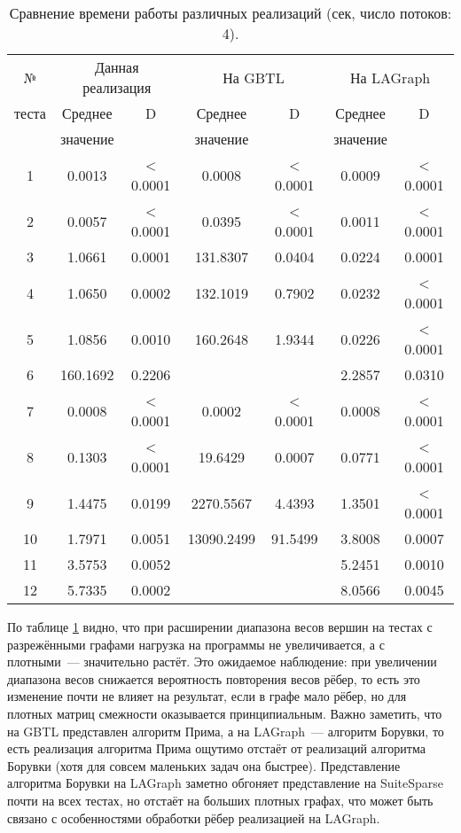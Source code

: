 \documentclass[14pt]{matmex-diploma-custom}
\begin{document}
\begin{table}[ht]
\caption{Сравнение времени работы различных реализаций (сек, число потоков: 4).} \label{2}
\centering
	\begin{tabular}{|c|c|c|c|c|c|c|}\hline
		№ & \multicolumn{2}{c|}{Данная реализация} & \multicolumn{2}{c|}{На GBTL} & \multicolumn{2}{c|}{На LAGraph}\\
		теста & Среднее & D & Среднее & D & Среднее & D \\
                & значение && значение && значение &\\\hline
		1 & 0.0013 & < 0.0001 & 0.0008 & < 0.0001 & 0.0009 & < 0.0001 \\\hline
		2 & 0.0057 & < 0.0001 & 0.0395 & < 0.0001 & 0.0011 & < 0.0001 \\\hline
        	3 & 1.0661 & 0.0001 & 131.8307 & 0.0404 & 0.0224 & 0.0001 \\\hline
        	4 & 1.0650 & 0.0002 & 132.1019 & 0.7902 & 0.0232 & < 0.0001 \\\hline
        	5 & 1.0856 & 0.0010 & 160.2648 & 1.9344 & 0.0226 & < 0.0001 \\\hline
        	6 & 160.1692 & 0.2206 &&& 2.2857 & 0.0310 \\\hline\hline
                7 & 0.0008 & < 0.0001 & 0.0002 & < 0.0001 & 0.0008 & < 0.0001 \\\hline
        	8 & 0.1303 & < 0.0001 & 19.6429 & 0.0007 & 0.0771 & < 0.0001 \\\hline
        	9 & 1.4475 & 0.0199 & 2270.5567 & 4.4393 & 1.3501 & < 0.0001 \\\hline
        	10 & 1.7971 & 0.0051 & 13090.2499 & 91.5499 & 3.8008 & 0.0007 \\\hline
        	11 & 3.5753 & 0.0052 &&& 5.2451 & 0.0010 \\\hline
        	12 & 5.7335 & 0.0002 &&& 8.0566 & 0.0045 \\\hline
        \end{tabular}
\end{table}

По таблице \ref{2} видно, что при расширении диапазона весов вершин на тестах с разрежёнными графами нагрузка на программы не увеличивается, а с плотными~--- значительно растёт. Это ожидаемое наблюдение: при увеличении диапазона весов снижается вероятность повторения весов рёбер, то есть это изменение почти не влияет на результат, если в графе мало рёбер, но для плотных матриц смежности оказывается принципиальным. Важно заметить, что на GBTL представлен алгоритм Прима, а на LAGraph~--- алгоритм Борувки, то есть реализация алгоритма Прима ощутимо отстаёт от реализаций алгоритма Борувки (хотя для совсем маленьких задач она быстрее). Представление алгоритма Борувки на LAGraph заметно обгоняет представление на SuiteSparse почти на всех тестах, но отстаёт на больших плотных графах, что может быть связано с особенностями обработки рёбер реализацией на LAGraph. 
\end{document}
